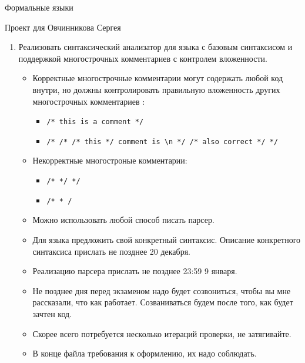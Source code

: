 \documentclass[12pt]{article}
\begin{document}
\begin{center}
{\LARGE Формальные языки}

{\Large Проект для Овчинникова Сергея}

\end{center}

\bigskip

\begin{enumerate}
  \item {Реализовать синтаксический анализатор для языка с базовым синтаксисом и поддержкой многострочных комментариев с контролем вложенности. }
  \begin{itemize}
    \item Корректные многострочные комментарии могут содержать любой код внутри, но должны контролировать правильную вложенность других многострочных комментариев :
    \begin{itemize}
      \item \verb!/* this is a comment */ !
      \item  \verb!/* /* /* this */ comment is \n */ /* also correct */ */ !
    \end{itemize}
    \item Некорректные многостроные комментарии:
    \begin{itemize}
      \item \verb!/* */ */!
      \item \verb!/* * /!
    \end{itemize}
    \item Можно использовать любой способ писать парсер.
    \item Для языка предложить свой конкретный синтаксис. Описание конкретного синтаксиса прислать не позднее 20 декабря.
    \item Реализацию парсера прислать не позднее 23:59 9 января.
    \item Не позднее дня перед экзаменом надо будет созвониться, чтобы вы мне рассказали, что как работает. Созваниваться будем после того, как будет зачтен код.
    \item Скорее всего потребуется несколько итераций проверки, не затягивайте.
    \item В конце файла требования к оформлению, их надо соблюдать.
  \end{itemize}

\end{enumerate}



\bigskip


\end{document}
